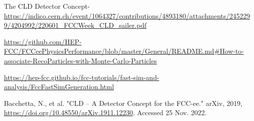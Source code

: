 \newcommand{\bib}{\bibitem}

\clearpage
{}
\begin{thebibliography}{9}

The CLD Detector Concept-
\url{https://indico.cern.ch/event/1064327/contributions/4893180/attachments/2452299/4204992/220601_FCCWeek_CLD_sailer.pdf}

\url{https://github.com/HEP-FCC/FCCeePhysicsPerformance/blob/master/General/README.md#How-to-associate-RecoParticles-with-Monte-Carlo-Particles}

\bibitem{}
\url{https://hep-fcc.github.io/fcc-tutorials/fast-sim-and-analysis/FccFastSimGeneration.html}


\bibitem{} Bacchetta, N., et al. "CLD -- A Detector Concept for the FCC-ee." arXiv, 2019, \url{https://doi.org/10.48550/arXiv.1911.12230}. Accessed 25 Nov. 2022.



\end{thebibliography}



